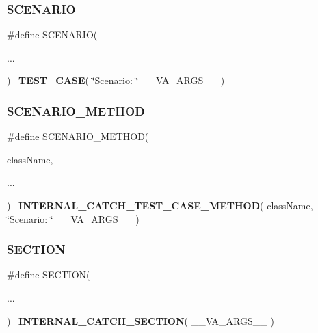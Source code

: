 \mbox{\label{catch_8hpp_acf8f441c7b9d70251ccbb7ccd8b83183}} 
\subsubsection{SCENARIO}
{\footnotesize\ttfamily \#define S\+C\+E\+N\+A\+R\+IO(\begin{DoxyParamCaption}\item[{}]{... }\end{DoxyParamCaption})~\textbf{ T\+E\+S\+T\+\_\+\+C\+A\+SE}( \char`\"{}Scenario\+: \char`\"{} \+\_\+\+\_\+\+V\+A\+\_\+\+A\+R\+G\+S\+\_\+\+\_\+ )}

\mbox{\label{catch_8hpp_add17eb8f8d85412a08a8a048cd38f33b}} 
\subsubsection{SCENARIO\_METHOD}
{\footnotesize\ttfamily \#define S\+C\+E\+N\+A\+R\+I\+O\+\_\+\+M\+E\+T\+H\+OD(\begin{DoxyParamCaption}\item[{}]{class\+Name,  }\item[{}]{... }\end{DoxyParamCaption})~\textbf{ I\+N\+T\+E\+R\+N\+A\+L\+\_\+\+C\+A\+T\+C\+H\+\_\+\+T\+E\+S\+T\+\_\+\+C\+A\+S\+E\+\_\+\+M\+E\+T\+H\+OD}( class\+Name, \char`\"{}Scenario\+: \char`\"{} \+\_\+\+\_\+\+V\+A\+\_\+\+A\+R\+G\+S\+\_\+\+\_\+ )}

\mbox{\label{catch_8hpp_ad512fd95a78b95770b9759823f8fbc21}} 
\subsubsection{SECTION}
{\footnotesize\ttfamily \#define S\+E\+C\+T\+I\+ON(\begin{DoxyParamCaption}\item[{}]{... }\end{DoxyParamCaption})~\textbf{ I\+N\+T\+E\+R\+N\+A\+L\+\_\+\+C\+A\+T\+C\+H\+\_\+\+S\+E\+C\+T\+I\+ON}( \+\_\+\+\_\+\+V\+A\+\_\+\+A\+R\+G\+S\+\_\+\+\_\+ )}

\mbox{\label{catch_8hpp_abad9ff23b730469f209b010e0ac4687c}} 

